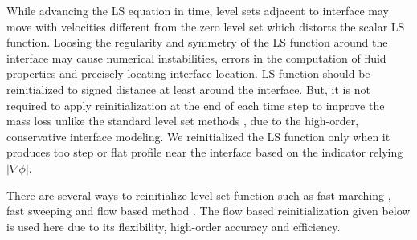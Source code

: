 \documentclass[11pt,a4paper,twoside]{article}
\begin{document}
	While advancing the LS equation in time, level sets adjacent to interface  may move  with velocities different from the  zero level set which distorts the scalar LS function.  Loosing the regularity and symmetry of the LS function  around the interface may cause numerical instabilities, errors in the computation of fluid properties and  precisely locating interface location. LS function should be reinitialized to signed distance at least around the interface. But, it is not required to apply reinitialization at the end of each time step to improve the mass loss unlike the standard level set methods \cite{sussman_level_1994,nagrath_computation_2005,smolianski_finite_2005}, due to the high-order, conservative interface modeling. We reinitialized the LS function only  when it produces too step or flat profile near the interface based on the indicator relying  $ \lvert \nabla \phi \rvert $.   
	
	There are several ways to reinitialize level set function such as fast marching \cite{tsai_fast_2003}, fast sweeping \cite{sethian_fast_1996} and flow based method \cite{sussman_level_1994}. The flow based reinitialization given below is used here due to its flexibility, high-order accuracy and efficiency. 
	
\end{document}
